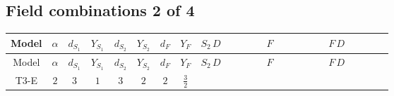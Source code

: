 \documentclass[8pt]{article}
\begin{document}
\begin{landscape}
\subsection*{Field combinations 2 of 4}
\begin{longtable}{@{}cccccccc >{\raggedright\arraybackslash}p{0.21\linewidth} >{\raggedright\arraybackslash}p{0.21\linewidth} >{\raggedright\arraybackslash}p{0.21\linewidth}@{}}
\toprule
Model & $\alpha$ & $d_{S_1}$ & $Y_{S_1}$ & $d_{S_2}$ & $Y_{S_2}$ & $d_F$ & $Y_F$ & $S_2\,D$ & $F$ & $F\,D$ \\
\midrule
\endfirsthead
\toprule
Model & $\alpha$ & $d_{S_1}$ & $Y_{S_1}$ & $d_{S_2}$ & $Y_{S_2}$ & $d_F$ & $Y_F$ & $S_2\,D$ & $F$ & $F\,D$ \\
\midrule
\endhead
T3-E & $2$ & $3$ & $1$ & $3$ & $2$ & $2$ & $\frac{3}{2}$ & \scriptsize\adjustbox{max width=\linewidth}{$\begin{gathered} +D_{\mu _1}\left(S_{2,j_1}\right){}^{\dagger } D_{\mu _1}\left(S_{2,j_1}\right)\end{gathered}$} & \scriptsize\adjustbox{max width=\linewidth}{$\begin{gathered} -\overline{F_{j_1,r_1}}\, F_{j_1,r_1} M_F\end{gathered}$} & \scriptsize\adjustbox{max width=\linewidth}{$\begin{gathered} +i \overline{F_{j_1,r_1}}\, \gamma ^{\mu _1}\, D_{\mu _1}\left(F_{j_1,r_1}\right)\end{gathered}$} \\
\midrule
\bottomrule
\end{longtable}
\clearpage

\end{landscape}
\end{document}

